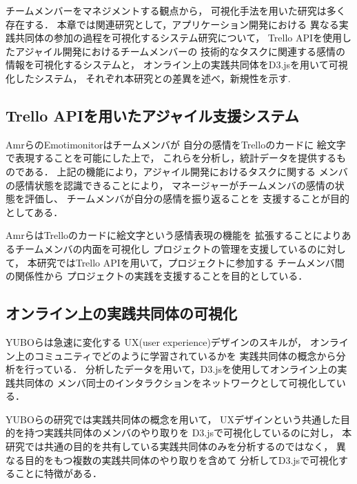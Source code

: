 
チームメンバーをマネジメントする観点から，
可視化手法を用いた研究は多く存在する．
本章では関連研究として，アプリケーション開発における
異なる実践共同体の参加の過程を可視化するシステム研究について，
Trello APIを使用したアジャイル開発におけるチームメンバーの
技術的なタスクに関連する感情の情報を可視化するシステムと，
オンライン上の実践共同体をD3.jsを用いて可視化したシステム，
それぞれ本研究との差異を述べ，新規性を示す.

\subsection{Trello APIを用いたアジャイル支援システム}
AmrらのEmotimonitor\cite{Emotimonitor}はチームメンバが
自分の感情をTrelloのカードに
絵文字で表現することを可能にした上で，
これらを分析し，統計データを提供するものである．
上記の機能により，アジャイル開発におけるタスクに関する
メンバの感情状態を認識できることにより，
マネージャーがチームメンバの感情の状態を評価し、
チームメンバが自分の感情を振り返ることを
支援することが目的としてある．

AmrらはTrelloのカードに絵文字という感情表現の機能を
拡張することによりあるチームメンバの内面を可視化し
プロジェクトの管理を支援しているのに対して，
本研究ではTrello APIを用いて，プロジェクトに参加する
チームメンバ間の関係性から
プロジェクトの実践を支援することを目的としている．　　　
\subsection{オンライン上の実践共同体の可視化}
YUBOら\cite{D3jsOfCop}は急速に変化する
UX(user experience)デザインのスキルが，
オンライン上のコミュニティでどのように学習されているかを
実践共同体の概念から分析を行っている．
分析したデータを用いて，D3.jsを使用してオンライン上の実践共同体の
メンバ同士のインタラクションをネットワークとして可視化している．

YUBOらの研究では実践共同体の概念を用いて，
UXデザインという共通した目的を持つ実践共同体のメンバのやり取りを
D3.jsで可視化しているのに対し，
本研究では共通の目的を共有している実践共同体のみを分析するのではなく，
異なる目的をもつ複数の実践共同体のやり取りを含めて
分析してD3.jsで可視化することに特徴がある．